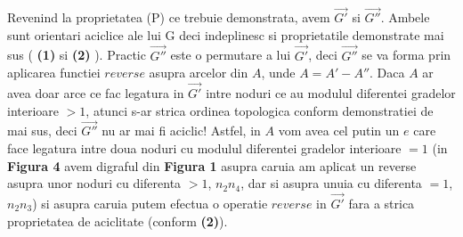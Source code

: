 \documentclass{article}
\begin{document}
 \par Revenind la proprietatea (P) ce trebuie demonstrata, avem $\vec{G'}$ si $\vec{G''}$. Ambele sunt orientari aciclice ale lui G deci indeplinesc si proprietatile demonstrate mai sus ( \textbf{(1)} si \textbf{(2)} ). Practic $\vec{G''}$ este o permutare a lui $\vec{G'}$, deci $\vec{G''}$ se va forma prin aplicarea functiei $reverse$ asupra arcelor din $A$, unde $A=A'-A''$. Daca $A$ ar avea doar arce ce fac legatura in $\vec{G'}$ intre noduri ce au modulul diferentei gradelor interioare $>1$, atunci s-ar strica ordinea topologica conform demonstratiei de mai sus, deci $\vec{G''}$ nu ar mai fi aciclic!   
 Astfel, in $A$ vom avea cel putin un $e$ care face legatura intre doua noduri cu modulul diferentei gradelor interioare $=1$ (in \textbf{Figura 4} avem digraful din \textbf{Figura 1} asupra caruia am aplicat un reverse asupra unor noduri cu diferenta $>1$, $n_{2}n_{4}$, dar si asupra unuia cu diferenta $=1$, $n_{2}n_{3}$) si asupra caruia putem efectua o operatie $reverse$ in $\vec{G'}$ fara a strica proprietatea de aciclitate (conform \textbf{(2)}).
\end{document}
